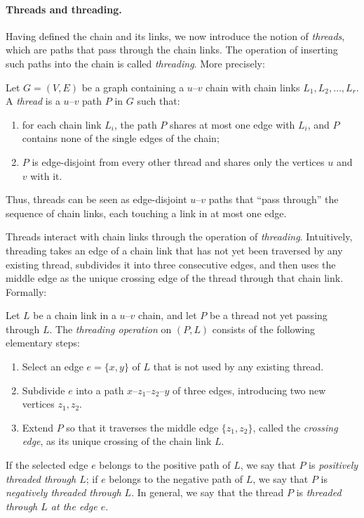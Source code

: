 \paragraph{Threads and threading.}
Having defined the chain and its links, we now introduce the notion of \emph{threads}, which are paths that pass through the chain links.
The operation of inserting such paths into the chain is called \emph{threading}. More precisely:

\begin{definition}[Thread]
\label{def:thread}
Let $G=(V,E)$ be a graph containing a $u$--$v$ chain with chain links $L_1,L_2,\dots,L_r$.
A \emph{thread} is a $u$--$v$ path $P$ in $G$ such that:
\begin{enumerate}
    \item for each chain link $L_i$, the path $P$ shares at most one edge with $L_i$, and $P$ contains none of the single edges of the chain;
    \item $P$ is edge-disjoint from every other thread and shares only the vertices $u$ and $v$ with it.
\end{enumerate}
\end{definition}

Thus, threads can be seen as edge-disjoint $u$--$v$ paths that ``pass through'' the sequence of chain links, each touching a link in at most one edge.

Threads interact with chain links through the operation of \emph{threading}.
Intuitively, threading takes an edge of a chain link that has not yet been traversed by any existing thread, subdivides it into three consecutive edges, and then uses the middle edge as the unique crossing edge of the thread through that chain link.
Formally:

\begin{definition}[Threading]
\label{def:threading}
Let $L$ be a chain link in a $u$--$v$ chain, and let $P$ be a thread not yet passing through $L$.
The \emph{threading operation} on $(P,L)$ consists of the following elementary steps:
\begin{enumerate}
    \item Select an edge $e=\{x,y\}$ of $L$ that is not used by any existing thread.
    \item Subdivide $e$ into a path $x$--$z_1$--$z_2$--$y$ of three edges, introducing two new vertices $z_1,z_2$.
    \item Extend $P$ so that it traverses the middle edge $\{z_1,z_2\}$, called the \emph{crossing edge}, as its unique crossing of the chain link $L$.
\end{enumerate}
If the selected edge $e$ belongs to the positive path of $L$, we say that $P$ is \emph{positively threaded through $L$}; if $e$ belongs to the negative path of $L$, we say that $P$ is \emph{negatively threaded through $L$}.
In general, we say that the thread $P$ is \emph{threaded through $L$ at the edge $e$}.
\end{definition}

